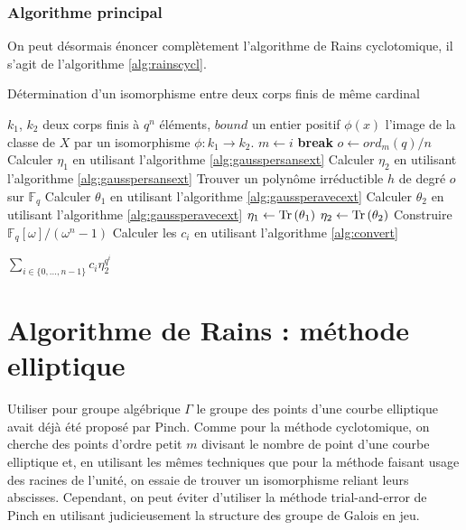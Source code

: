 \documentclass[a4paper]{article} %
\numberwithin{section}{part}
\numberwithin{equation}{section}
\newcommand\zmodninv[1]{(\mathbb{Z}/#1\mathbb{Z})^{\times}}
\newcommand\GF[1]{\mathbb{F}_{#1}}
\newcommand\Tr[1]{\textup{Tr}\left(#1\right)}
\begin{document}
\subsubsection*{Algorithme principal}

On peut désormais énoncer complètement l'algorithme de Rains cyclotomique, il
s'agit de l'algorithme \ref{alg:rainscycl}.

\begin{algorithm}
\caption{Détermination d'un isomorphisme entre deux corps finis de même
cardinal}
\label{alg:rainscycl}
\begin{algorithmic}[1]
\REQUIRE $k_1$, $k_2$ deux corps finis à $q^n$ éléments, $bound$ un entier
positif
\ENSURE $\phi(x)$ l'image de la classe de $X$ par un isomorphisme $\phi : k_1
\to k_2$. 
\bigskip
{}
\IF{$\big(n\mid\varphi(i)\big)$ \& $\big((n,\varphi(i)/n) = 1\big)$ \&
$\big(\exists\alpha\in\zmodninv{m} : ord_m(\alpha) = n\big)$}
    \STATE $m \leftarrow i$
    \STATE \textbf{break}
\ENDIF
\ENDFOR
\STATE $o \leftarrow ord_m(q)/n$
    \STATE Calculer $\eta_1$ en utilisant l'algorithme \ref{alg:gausspersansext}
    \STATE Calculer $\eta_2$ en utilisant l'algorithme \ref{alg:gausspersansext}
\ELSE
    \STATE Trouver un polynôme irréductible $h$ de degré $o$ sur $\GF{q}$
    \STATE Calculer $\theta_1$ en utilisant l'algorithme 
    \ref{alg:gaussperavecext}
    \STATE Calculer $\theta_2$ en utilisant l'algorithme 
    \ref{alg:gaussperavecext}
    \STATE $\eta_1 \leftarrow \Tr{\theta_1}$
    \STATE $\eta_2 \leftarrow \Tr{\theta_2}$
\ENDIF
\STATE Construire $\GF{q}[\omega]/(\omega^n - 1)$
\STATE Calculer les $c_i$ en utilisant l'algorithme \ref{alg:convert}

\RETURN $\sum_{i\in\lbrace{0,\dots,n-1}\rbrace}{c_i\eta_2^{q^i}}$

\end{algorithmic}
\end{algorithm}

\section{Algorithme de Rains : méthode elliptique}
Utiliser pour groupe algébrique $\Gamma$ le groupe des points d'une courbe
elliptique avait déjà été proposé par Pinch\cite{Pin}. Comme pour la méthode
cyclotomique, on cherche des points d'ordre petit $m$ divisant le nombre de
point d'une courbe elliptique et, en utilisant les mêmes techniques que pour la
méthode faisant usage des racines de l'unité, on essaie de trouver un
isomorphisme reliant leurs abscisses. Cependant, on peut éviter d'utiliser la
méthode trial-and-error de Pinch en utilisant judicieusement la structure des
groupe de Galois en jeu. 
\end{document}
